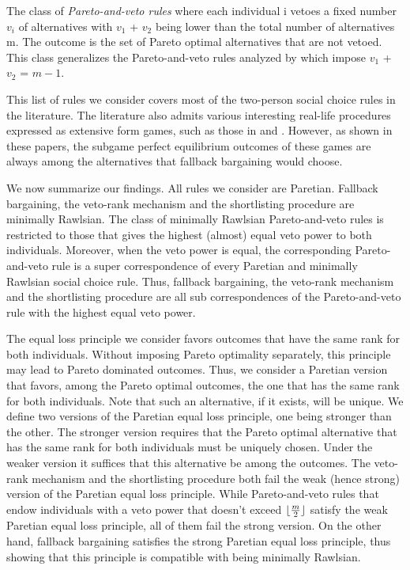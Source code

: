 \documentclass[version=3.21, pagesize, twoside=off, bibliography=totoc, DIV=calc, fontsize=12pt, a4paper]{scrartcl}
\begin{document}
The class of \textit{Pareto-and-veto rules} where each individual i vetoes a fixed number $v_i$ of alternatives with $v_1$ + $v_2$ being lower than the total number of alternatives m. The outcome is the set of Pareto optimal alternatives that are not vetoed. This class generalizes the Pareto-and-veto rules analyzed by \cite{laslier2021solution} which impose $v_1$ + $v_2$ = $m-1$.
  
This list of rules we consider covers most of the two-person social choice rules in the literature. The literature also admits various interesting real-life procedures expressed as extensive form games, such as those in \cite{anbarci1993noncooperative, anbarci2006finite} and \cite{barbera2022compromising}. However, as shown in these papers, the subgame perfect equilibrium outcomes of these games are always among the alternatives that fallback bargaining would choose. 

We now summarize our findings. All rules we consider are Paretian. Fallback bargaining, the veto-rank mechanism and the shortlisting procedure are minimally Rawlsian. The class of minimally Rawlsian Pareto-and-veto rules is restricted to those that gives the highest (almost) equal veto power to both individuals. Moreover, when the veto power is equal, the corresponding Pareto-and-veto rule is a super correspondence of every Paretian and minimally Rawlsian social choice rule. Thus, fallback bargaining, the veto-rank mechanism and the shortlisting procedure are all sub correspondences of the Pareto-and-veto rule with the highest equal veto power.

The equal loss principle we consider favors outcomes that have the same rank for both individuals. Without imposing Pareto optimality separately, this principle may lead to Pareto dominated outcomes. Thus, we consider a Paretian version that favors, among the Pareto optimal outcomes, the one that has the same rank for both individuals. Note that such an alternative, if it exists, will be unique. We define two versions of the Paretian equal loss principle, one being stronger than the other. The stronger version requires that the Pareto optimal alternative that has the same rank for both individuals must be uniquely chosen. Under the weaker version it suffices that this alternative be among the outcomes. The veto-rank mechanism and the shortlisting procedure both fail the weak (hence strong) version of the Paretian equal loss principle. While Pareto-and-veto rules that endow individuals with a veto power that doesn't exceed $\lfloor\frac{m}{2}\rfloor$ satisfy the weak Paretian equal loss principle, all of them fail the strong version. On the other hand, fallback bargaining satisfies the strong Paretian equal loss principle, thus showing that this principle is compatible with being minimally Rawlsian.
 
\end{document}
